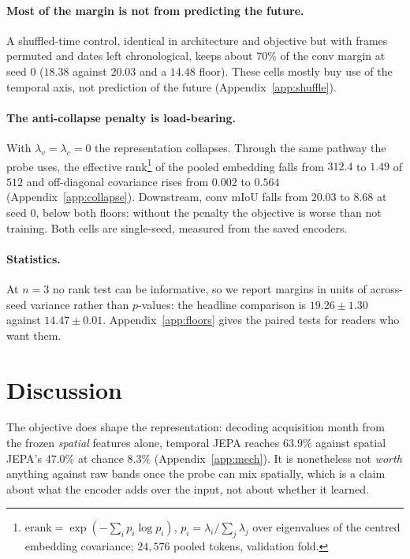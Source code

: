 \documentclass{article}
\begin{document}
\paragraph{Most of the margin is not from predicting the future.} A shuffled-time control, identical
in architecture and objective but with frames permuted and dates left chronological, keeps about
$70\%$ of the conv margin at seed 0 ($18.38$ against $20.03$ and a $14.48$ floor). These cells mostly
buy use of the temporal axis, not prediction of the future (Appendix~\ref{app:shuffle}).

\paragraph{The anti-collapse penalty is load-bearing.} With $\lambda_v{=}\lambda_c{=}0$ the
representation collapses. Through the same pathway the probe uses, the effective
rank\footnote{$\mathrm{erank}=\exp(-\sum_i p_i\log p_i)$, $p_i=\lambda_i/\sum_j\lambda_j$ over eigenvalues
of the centred embedding covariance; $24{,}576$ pooled tokens, validation fold.}
of the pooled embedding falls from $312.4$ to $1.49$ of $512$ and off-diagonal covariance rises from
$0.002$ to $0.564$ (Appendix~\ref{app:collapse}). Downstream, conv mIoU falls from $20.03$ to $8.68$
at seed 0, below both floors: without the penalty the objective is worse than not training. Both
cells are single-seed, measured from the saved encoders.

\paragraph{Statistics.} At $n{=}3$ no rank test can be informative, so we report margins in units of
across-seed variance rather than $p$-values: the headline comparison is $19.26 \pm 1.30$ against
$14.47 \pm 0.01$. Appendix~\ref{app:floors} gives the paired tests for readers who want them.

\section{Discussion}

The objective does shape the representation: decoding acquisition month from the frozen \emph{spatial}
features alone, temporal JEPA reaches $63.9\%$ against spatial JEPA's $47.0\%$ at chance $8.3\%$
(Appendix~\ref{app:mech}). It is nonetheless not \emph{worth} anything against raw bands once the
probe can mix spatially, which is a claim about what the encoder adds over the input, not about
whether it learned.
\end{document}
